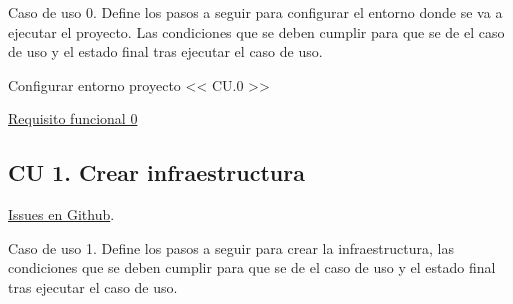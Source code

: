 	\begin{text}
		Caso de uso 0. Define los pasos a seguir para configurar el entorno donde se va a ejecutar el proyecto. Las condiciones que se deben cumplir para que se de el caso de uso y el estado final tras ejecutar el caso de uso.
	\end{text}

	\begin{usecase}{Configurar entorno proyecto << CU.0 >>}
		
		
		
		
		\hline
	\end{usecase}

	\hyperref[RF0]{Requisito funcional 0}
	\clearpage
	
	\subsection{CU 1. Crear infraestructura}
	\href{https://github.com/VictorMorenoJimenez/tfg2020/milestone/6}{Issues en Github}.
	
	\begin{text}
		Caso de uso 1. Define los pasos a seguir para crear la infraestructura, las condiciones que se deben cumplir para que se de el caso de uso y el estado final tras ejecutar el caso de uso.
	\end{text}

